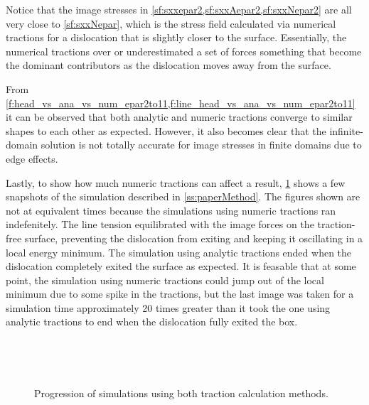 Notice that the image stresses in \cref{sf:sxxepar2,sf:sxxAepar2,sf:sxxNepar2} are all very close to \cref{sf:sxxNepar}, which is the stress field calculated via numerical tractions for a dislocation that is slightly closer to the surface. Essentially, the numerical tractions over or underestimated a set of forces something that become the dominant contributors as the dislocation moves away from the surface.

From \cref{f:head_vs_ana_vs_num_epar2to11,f:line_head_vs_ana_vs_num_epar2to11} it can be observed that both analytic and numeric tractions converge to similar shapes to each other as expected. However, it also becomes clear that the infinite-domain solution is not totally accurate for image stresses in finite domains due to edge effects.

Lastly, to show how much numeric tractions can affect a result, \cref{f:simulation} shows a few snapshots of the simulation described in \cref{ss:paperMethod}. The figures shown are not at equivalent times because the simulations using numeric tractions ran indefenitely. The line tension equilibrated with the image forces on the traction-free surface, preventing the dislocation from exiting and keeping it oscillating in a local energy minimum. The simulation using analytic tractions ended when the dislocation completely exited the surface as expected. It is feasable that at some point, the simulation using numeric tractions could jump out of the local minimum due to some spike in the tractions, but the last image was taken for a simulation time approximately 20 times greater than it took the one using analytic tractions to end when the dislocation fully exited the box.
\begin{figure}
  ~
  ~

  ~
  ~
  \caption[Unloaded simulations using analytic and numeric tractions.]{Progression of simulations using both traction calculation methods.}
  \label{f:simulation}
\end{figure}

